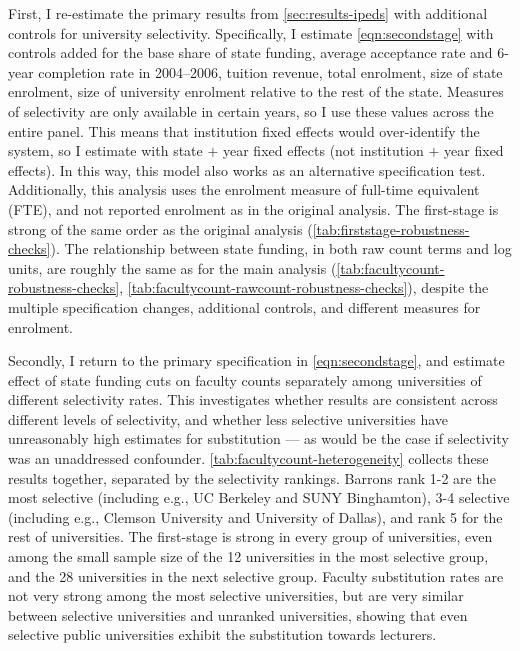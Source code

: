 First, I re-estimate the primary results from \autoref{sec:results-ipeds} with additional controls for university selectivity.
Specifically, I estimate \autoref{eqn:secondstage} with controls added for the base share of state funding, average acceptance rate and 6-year completion rate  in 2004--2006, tuition revenue, total enrolment, size of state enrolment, size of university enrolment relative to the rest of the state.
Measures of selectivity are only available in certain years, so I use these values across the entire panel.
This means that institution fixed effects would over-identify the system, so I estimate with state $+$ year fixed effects (not institution $+$ year fixed effects).
In this way, this model also works as an alternative specification test.
Additionally, this analysis uses the enrolment measure of full-time equivalent (FTE), and not reported enrolment as in the original analysis.
The first-stage is strong of the same order as the original analysis (\autoref{tab:firststage-robustness-checks}).
The relationship between state funding, in both raw count terms and log units, are roughly the same as for the main analysis (\autoref{tab:facultycount-robustness-checks}, \ref{tab:facultycount-rawcount-robustness-checks}), despite the multiple specification changes, additional controls, and different measures for enrolment.

Secondly, I return to the primary specification in \autoref{eqn:secondstage}, and estimate effect of state funding cuts on faculty counts separately among universities of different selectivity rates.
This investigates whether results are consistent across different levels of selectivity, and whether less selective universities have unreasonably high estimates for substitution --- as would be the case if selectivity was an unaddressed confounder.
\autoref{tab:facultycount-heterogeneity} collects these results together, separated by the \cite{barrons2009} selectivity rankings.
Barrons rank 1-2 are the most selective (including e.g., UC Berkeley and SUNY Binghamton), 3-4 selective (including e.g., Clemson University and University of Dallas), and rank 5 for the rest of universities.
The first-stage is strong in every group of universities, even among the small sample size of the 12 universities in the most selective group, and the 28 universities in the next selective group.
Faculty substitution rates are not very strong among the most selective universities, but are very similar between selective universities and unranked universities, showing that even selective public universities exhibit the substitution towards lecturers.

